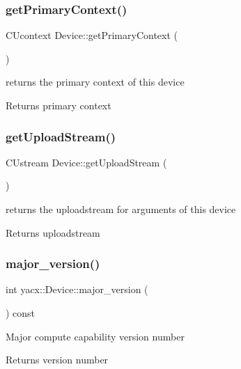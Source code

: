 \subsubsection{\texorpdfstring{get\+Primary\+Context()}{getPrimaryContext()}}
{\footnotesize\ttfamily C\+Ucontext Device\+::get\+Primary\+Context (\begin{DoxyParamCaption}{ }\end{DoxyParamCaption})}

returns the primary context of this device \begin{DoxyReturn}{Returns}
primary context 
\end{DoxyReturn}
\mbox{\label{classyacx_1_1_device_a9b226ea765e496ca388a466875f40d72}} 
\subsubsection{\texorpdfstring{get\+Upload\+Stream()}{getUploadStream()}}
{\footnotesize\ttfamily C\+Ustream Device\+::get\+Upload\+Stream (\begin{DoxyParamCaption}{ }\end{DoxyParamCaption})}

returns the uploadstream for arguments of this device \begin{DoxyReturn}{Returns}
uploadstream 
\end{DoxyReturn}
\mbox{\label{classyacx_1_1_device_ac72d60151e4070d118cd0aadd0d7d448}} 
\subsubsection{\texorpdfstring{major\+\_\+version()}{major\_version()}}
{\footnotesize\ttfamily int yacx\+::\+Device\+::major\+\_\+version (\begin{DoxyParamCaption}{ }\end{DoxyParamCaption}) const\hspace{0.3cm}{\ttfamily [inline]}}

Major compute capability version number \begin{DoxyReturn}{Returns}
version number 
\end{DoxyReturn}
\mbox{\label{classyacx_1_1_device_a34e5cca7423047044ac3e683bf0eb2f9}} 
